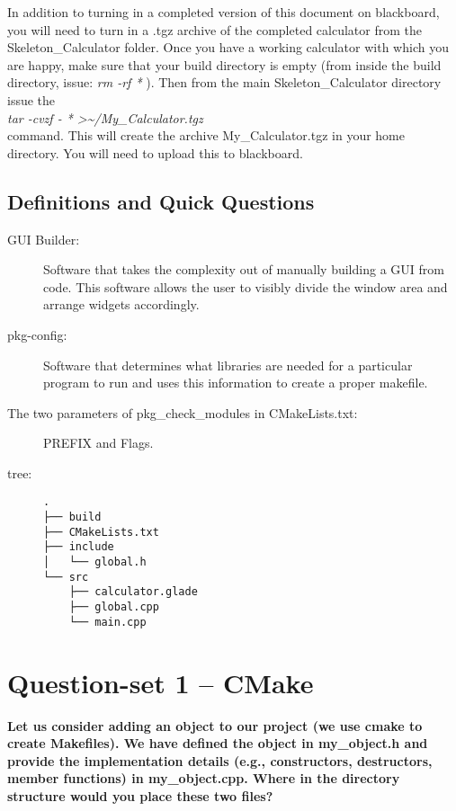 \documentclass{article}
\begin{document}
In addition to turning in a completed version of this document on blackboard, you will need to turn in a .tgz archive of the completed calculator from the Skeleton\_Calculator folder. Once you have a working calculator with which you are happy, make sure that your build directory is empty (from inside the build directory, issue: \textit{rm -rf * }). Then from the main Skeleton\_Calculator directory issue the\\ \textit{tar -cvzf - * \textgreater\textasciitilde/My\_Calculator.tgz} \\
command. This will create the archive My\_Calculator.tgz in your home directory. You will need to upload this to blackboard.

\subsection{Definitions and Quick Questions}
\label{definitions}
\begin{description}
\item[GUI Builder:]
Software that takes the complexity out of manually building a GUI from code. This software allows the user to visibly divide the window area and arrange widgets accordingly.   
\item[pkg-config:]
Software that determines what libraries are needed for a particular program to run and uses this information to create a proper makefile.
\item[The two parameters of pkg\_check\_modules in CMakeLists.txt:]
PREFIX and Flags.
\item[tree:]
\begin{verbatim}
.
├── build
├── CMakeLists.txt
├── include
│   └── global.h
└── src
    ├── calculator.glade
    ├── global.cpp
    └── main.cpp
\end{verbatim}
\item[]
\end{description} 

\section{Question-set 1 -- CMake}
\textbf{Let us consider adding an object to our project (we use cmake to create Makefiles). We have defined the object in my\_object.h and provide the implementation details (e.g., constructors, destructors, member functions) in my\_object.cpp. Where in the directory structure would you place these two files? }\\
\end{document}
